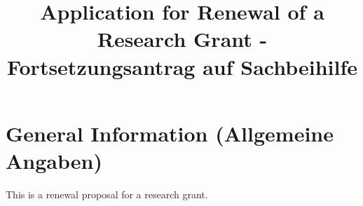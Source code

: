 \documentclass[twoside,10pt]{article}
\begin{document}
\sffamily
\title{Application for Renewal of a Research Grant - 
  Fortsetzungsantrag auf Sachbeihilfe}
\date{}


%
%

\section{General Information (Allgemeine Angaben)}
This is a renewal proposal for a research grant.
\end{document}
